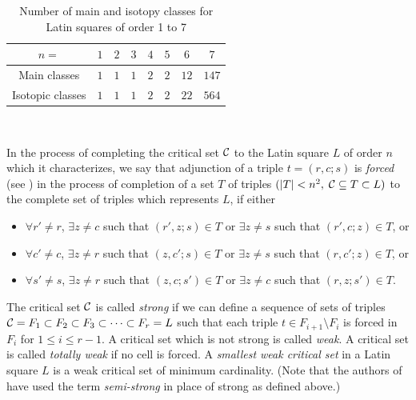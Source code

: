 \begin{table}
\begin{center}
\caption{Number of main and isotopy classes for Latin squares of order 1 to 7}
\begin{tabular}{|c|c|c|c|c|c|c|c|} \hline
$n=$ & $1$ & $2$ & $3$ & $4$ & $5$ & $6$ & $7$ \\ \hline
Main classes & $1$ & $1$ & $1$ & $2$ & $2$ & $12$ & $147$ \\ \hline
Isotopic classes & $1$ & $1$ & $1$ & $2$ & $2$ & $22$ & $564$ \\ \hline
\end{tabular} \vspace {3mm} \\
\end{center}
\end{table}

In the process of completing the critical set ${\cal C}$ to the 
Latin square $L$ of order $n$ which it characterizes, we say that adjunction 
of a triple $t=(r,c;s)$ is {\em forced} (see \cite {MR99j:05036})
in the process of completion of a set $T$ of triples 
$(|T|<n^2,\;{\cal C}\subseteq T\subset L)$ to the complete set of
triples which represents $L$, if either

\begin{itemize}
\item [(i)] $\forall r' \neq r$, $\exists z \neq c$ such that 
$(r',z;s)\in T$ or $\exists z \neq s$ such that 
$(r',c;z)\in T$, or 

\item [(ii)] $\forall c' \neq c$, $\exists z \neq r$ such that 
$(z,c';s)\in T$ or $\exists z \neq s$ such that 
$(r,c';z)\in T$, or

\item [(iii)] $\forall s' \neq s$, $\exists z \neq r$ such that 
$(z,c;s')\in T$ or $\exists z \neq c$ such that 
$(r,z;s')\in T$.
\end{itemize}

\noindent The critical set ${\cal C}$ is called {\em strong} 
if we can define a sequence of sets of triples 
${\cal C} = F_1 \subset F_2\subset F_3\subset \dots \subset F_r=L$ 
such that each triple $t\in F_{i+1}\setminus F_i$ is forced in 
$F_i$ for $1\leq i\leq r-1$. 
A critical set which is not strong is called {\em weak}.
A critical set is called {\em totally weak} if no cell is forced.
A {\it smallest weak critical set} in a Latin square $L$ is 
a weak critical set of minimum cardinality.
(Note that the authors of \cite {MR2000g:05034} have used 
the term {\em semi-strong} in place of strong 
as defined above.)

